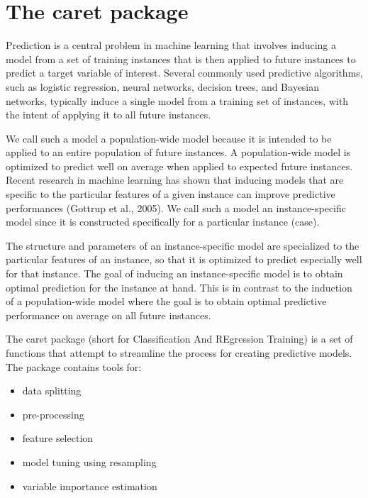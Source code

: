 \documentclass[caret-main.tex]{subfiles}
\begin{document}
\section{The caret package}

Prediction is a central problem in machine learning that involves inducing a model from a set of
training instances that is then applied to future instances to predict a target variable of interest.
Several commonly used predictive algorithms, such as logistic regression, neural networks, decision
trees, and Bayesian networks, typically induce a single model from a training set of instances, with
the intent of applying it to all future instances. 


We call such a model a population-wide model
because it is intended to be applied to an entire population of future instances. A population-wide
model is optimized to predict well on average when applied to expected future instances.
Recent research in machine learning has shown that inducing models that are speciﬁc to the
particular features of a given instance can improve predictive performances (Gottrup et al., 2005).
We call such a model an instance-speciﬁc model since it is constructed speciﬁcally for a particular
instance (case). 

The structure and parameters of an instance-speciﬁc model are specialized to the
particular features of an instance, so that it is optimized to predict especially well for that instance.
The goal of inducing an instance-speciﬁc model is to obtain optimal prediction for the instance at
hand. This is in contrast to the induction of a population-wide model where the goal is to obtain
optimal predictive performance on average on all future instances.


The caret package (short for Classification And REgression Training) is a set of functions that attempt to streamline the process for creating predictive models. The package contains tools for:

\begin{itemize}
\item data splitting
\item pre-processing
\item feature selection
\item model tuning using resampling
\item variable importance estimation
\end{itemize}


\end{document}
